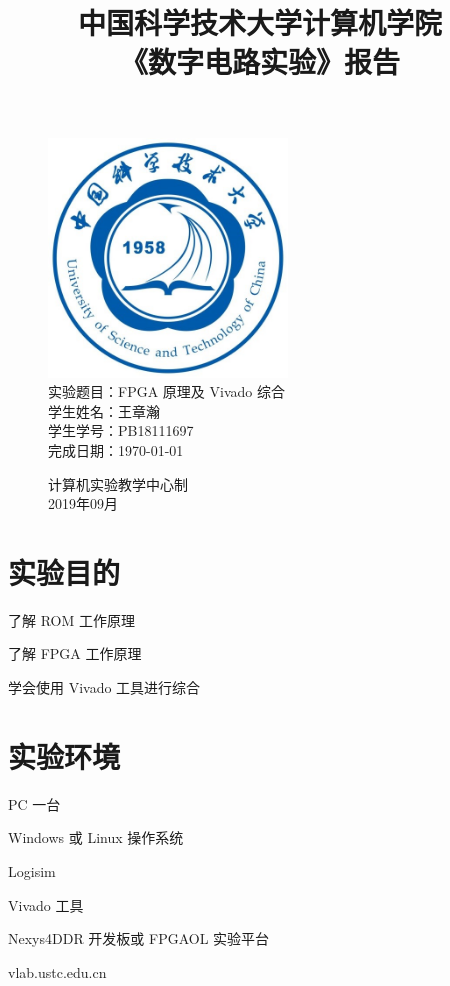 \documentclass[UTF8]{article}
\title{中国科学技术大学计算机学院\\《数字电路实验》报告}
\author{}
\date{}
\begin{document}
	\maketitle
	\begin{figure}[H]
		\centering
		\includegraphics[width=2.5in]{xiaohui.jpg}\vspace{0.5cm}\\
		\large{
			实验题目：FPGA 原理及 Vivado 综合\\
			学生姓名：王章瀚\\
			学生学号：PB18111697\\
			完成日期：\today\\
		}\vspace{2cm}
		
		\large{计算机实验教学中心制\\2019年09月\\}
		\thispagestyle{empty}
		\clearpage  %
	\end{figure}


	\section{实验目的}
	了解 ROM 工作原理\par
	了解 FPGA 工作原理\par
	学会使用 Vivado 工具进行综合\par
	
	\section{实验环境}
	PC 一台\par
	Windows 或 Linux 操作系统\par
	Logisim\par
	Vivado 工具\par
	Nexys4DDR 开发板或 FPGAOL 实验平台\par
	vlab.ustc.edu.cn\par
	
\end{document}

